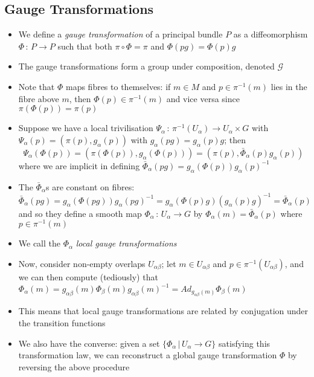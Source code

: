 \documentclass[12pt,a4paper]{article}
\numberwithin{equation}{section}
\begin{document}
	\subsection{Gauge Transformations}
	\begin{itemize}
		\item We define a \textit{gauge transformation} of a principal bundle $P$ as a diffeomorphism $\Phi\,:\,P\to P$ such that both $\pi\circ\Phi=\pi$ and $\Phi(pg)=\Phi(p)g$
		\item The gauge transformations form a group under composition, denoted $\mathcal{G}$
		\item Note that $\Phi$ maps fibres to themselves: if $m\in M$ and $p\in\pi^{-1}(m)$ lies in the fibre above $m$, then $\Phi(p)\in\pi^{-1}(m)$ and vice versa since $\pi(\Phi(p))=\pi(p)$
		\item Suppose we have a local trivilisation $\Psi_{\alpha}\,:\,\pi^{-1}(U_{\alpha})\to U_{\alpha}\times G$ with $\Psi_{\alpha}(p)=(\pi(p),g_{\alpha}(p))$ with $g_{\alpha}(pg)=g_{\alpha}(p)g$; then
		\begin{equation}
			\Psi_{\alpha}(\Phi(p))=(\pi(\Phi(p)),g_{\alpha}(\Phi(p)))=(\pi(p),\bar{\Phi}_{\alpha}(p)g_{\alpha}(p))
		\end{equation}
		where we are implicit in defining $\bar{\Phi}_{\alpha}(pg)=g_{\alpha}(\Phi(p))g_{\alpha}(p)^{-1}$
		\item The $\bar{\Phi}_{\alpha}$s are constant on fibres:
		\begin{equation}
			\bar{\Phi}_{\alpha}(pg)=g_{\alpha}(\Phi(pg))g_{\alpha}(pg)^{-1}=g_{\alpha}(\Phi(p)g)(g_{\alpha}(p)g)^{-1}=\bar{\Phi}_{\alpha}(p)
		\end{equation}
		and so they define a smooth map $\Phi_{\alpha}\,:\,U_{\alpha}\to G$ by $\Phi_{\alpha}(m)=\bar{\Phi}_{\alpha}(p)$ where $p\in\pi^{-1}(m)$
		\item We call the $\Phi_{\alpha}$ \textit{local gauge transformations}
		\item Now, consider non-empty overlaps $U_{\alpha\beta}$; let $m\in U_{\alpha\beta}$ and $p\in\pi^{-1}(U_{\alpha\beta})$, and we can then compute (tediously) that $\Phi_{\alpha}(m)=g_{\alpha\beta}(m)\Phi_{\beta}(m)g_{\alpha\beta}(m)^{-1}=Ad_{g_{\alpha\beta}(m)}\Phi_{\beta}(m)$
		\item This means that local gauge transformations are related by conjugation under the transition functions
		\item We also have the converse: given a set $\{\Phi_{\alpha}\,|\,U_{\alpha}\to G\}$ satisfying this transformation law, we can reconstruct a global gauge transformation $\Phi$ by reversing the above procedure

\end{itemize}
\end{document}
